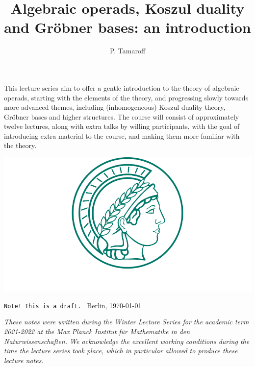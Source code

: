 \documentclass[fleqn, a4paper, twoside]{article}
\title{
	\vspace{-5 em}
	\setstretch{0.85}
		{
		\textbf
			{Algebraic operads, 
			Koszul duality and Gr\"obner bases: 
			an introduction}
		}
	}
\author{P. Tamaroff}
\newcommand{\0}{\langle 0\rangle}
\DeclareRobustCommand{\[}{\begin{equation}}%
\DeclareRobustCommand{\]}{\end{equation}}%
\theoremstyle{mytheorem}
\theoremstyle{introthm}
\theoremstyle{mydefinition}
\theoremstyle{mydefinition2}
\theoremstyle{plain} %
\theoremstyle{mytheorem}
\renewenvironment{abstract}{%
\small\begin{center}
\begin{minipage}{.9\textwidth}
}
{\par\noindent\end{minipage}\end{center}\vspace{3 em}}
\newcommand\blankpage{%
    \null
    \thispagestyle{empty}%
    \newpage}
\begin{document}
\pagecolor{pagecolor}
\maketitle
\thispagestyle{empty}

\begin{abstract}
This lecture series aim to offer a gentle introduction to the theory of algebraic 
operads, starting with the elements of the theory, and progressing slowly towards
more advanced themes, including (inhomogeneous) Koszul duality theory, Gr\"obner 
bases and higher structures. The course will consist of approximately twelve 
lectures, along with extra talks by willing participants, with the goal of 
introducing extra material to the course, and making them more familiar with the 
theory.
\end{abstract}

\vspace{2 cm}

\begin{center}
\includegraphics[scale=.35]{logoMPG.png}
\end{center}

\vfill
\vfill

\texttt{Note! This is a draft. } \hfill	Berlin, \today


\afterpage{\blankpage}
\newpage

\vspace*{\fill} 

\emph{These notes were written during the Winter Lecture Series for the academic 
term 2021-2022 at the \emph{Max Planck Institut f\"ur Mathematike in den 
Naturwissenschaften}. We acknowledge the excellent working conditions during the 
time the lecture series took place, which in particular allowed to produce these 
lecture notes.}
\end{document}
